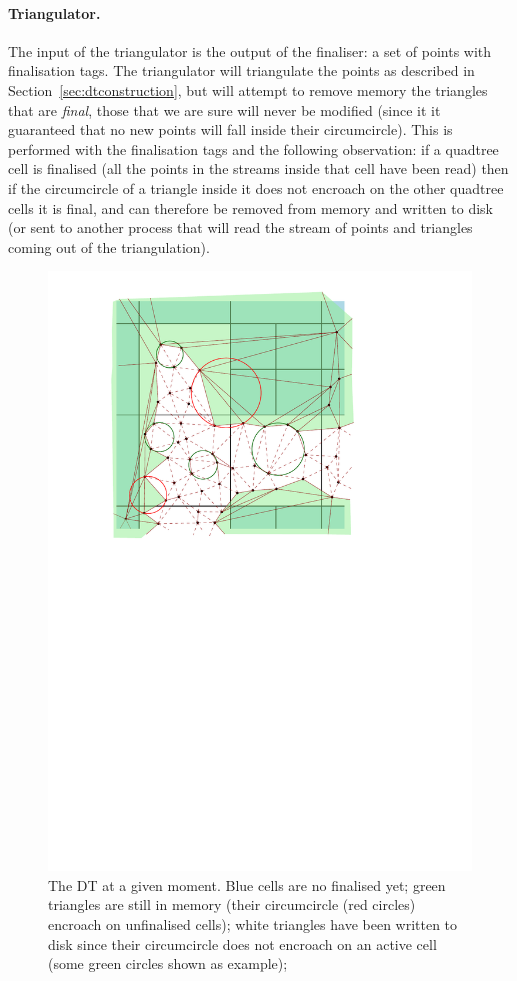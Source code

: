 \paragraph{Triangulator.}
The input of the triangulator is the output of the finaliser: a set of points with finalisation tags.
The triangulator will triangulate the points as described in Section~\ref{sec:dtconstruction}, but will attempt to remove memory the triangles that are \emph{final}, those that we are sure will never be modified (since it it guaranteed that no new points will fall inside their circumcircle).
This is performed with the finalisation tags and the following observation: if a quadtree cell is finalised (all the points in the streams inside that cell have been read) then if the circumcircle of a triangle inside it does not encroach on the other quadtree cells it is final, and can therefore be removed from memory and written to disk (or sent to another process that will read the stream of points and triangles coming out of the triangulation).

\begin{figure}
  \centering
  \includegraphics[width=\linewidth]{figs/triangulator}
  \caption{The DT at a given moment. Blue cells are no finalised yet; green triangles are still in memory (their circumcircle (red circles) encroach on unfinalised cells); white triangles have been written to disk since their circumcircle does not encroach on an active cell (some green circles shown as example); }%
\label{fig:triangulator}
\end{figure}


